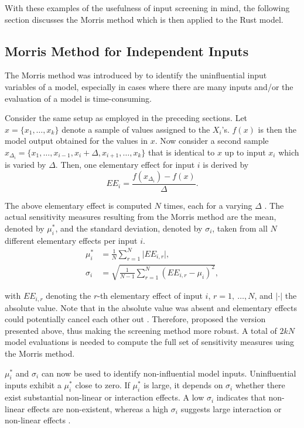 With these examples of the usefulness of input screening in mind, the following section discusses the Morris method which is then applied to the Rust model.

\subsection{Morris Method for Independent Inputs} \label{classic_morris}

The Morris method was introduced by \citet{M91} to identify the uninfluential input variables of a model, especially in cases where there are many inputs and/or the evaluation of a model is time-consuming.

Consider the same setup as employed in the preceding sections. Let $x = \{x_1, \dots, x_k\}$ denote a sample of values assigned to the $X_i$'s. $f(x)$ is then the model output obtained for the values in $x$. Now consider a second sample $x_{\Delta_i} = \{x_1, \dots, x_{i-1}, x_i + \Delta, x_{i+1}, \dots, x_k\}$ that is identical to $x$ up to input $x_i$ which is varied by $\Delta$. Then, one elementary effect for input $i$ is derived by
\begin{equation*}
EE_i = \frac{f(x_{\Delta_i}) - f(x)}{\Delta}.
\end{equation*}

The above elementary effect is computed $N$ times, each for a varying $\Delta$ \citep{GM17}. The actual sensitivity measures resulting from the Morris method are the mean, denoted by $\mu^\ast_i$, and the standard deviation, denoted by $\sigma_i$, taken from all $N$ different elementary effects per input $i$.
\begin{align}
\mu_i^\ast& = \frac{1}{N} \sum_{r=1}^N \vert EE_{i, r} \vert, \label{mu}\\
\sigma_i& = \sqrt{\frac{1}{N-1} \sum_{r=1}^N (EE_{i, r} - \mu_i)^2}, \label{sigma}
\end{align}

\noindent with $EE_{i, r}$ denoting the $r$-th elementary effect of input $i$, $r = 1,\ \dots, N$, and $\vert \cdot \vert$ the absolute value. Note that in \citet{M91} the absolute value was absent and elementary effects could potentially cancel each other out \citep{CCS07}. Therefore, \citet{CCS07} proposed the version presented above, thus making the screening method more robust. A total of $2 k N$ model evaluations is needed to compute the full set of sensitivity measures using the Morris method.

$\mu_i^\ast$ and $\sigma_i$ can now be used to identify non-influential model inputs. Uninfluential inputs exhibit a $\mu_i^\ast$ close to zero. If $\mu_i^\ast$ is large, it depends on $\sigma_i$ whether there exist substantial non-linear or interaction effects. A low $\sigma_i$ indicates that non-linear effects are non-existent, whereas a high $\sigma_i$ suggests large interaction or non-linear effects \citep{GM17}.

